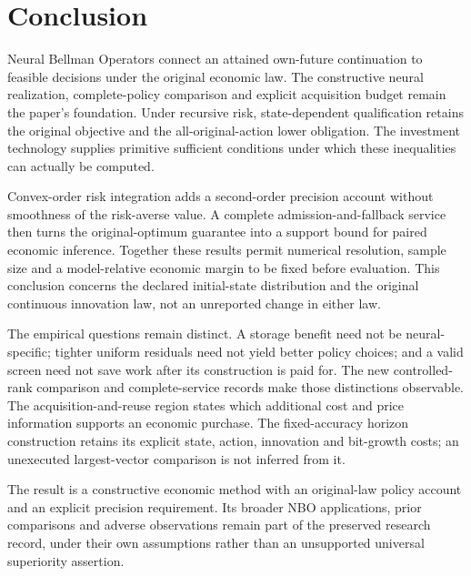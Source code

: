 \section{Conclusion}\label{sec:conclusion65}
Neural Bellman Operators connect an attained own-future continuation to feasible decisions under the original economic law. The constructive neural realization, complete-policy comparison and explicit acquisition budget remain the paper's foundation. Under recursive risk, state-dependent qualification retains the original objective and the all-original-action lower obligation. The investment technology supplies primitive sufficient conditions under which these inequalities can actually be computed.

Convex-order risk integration adds a second-order precision account without smoothness of the risk-averse value. A complete admission-and-fallback service then turns the original-optimum guarantee into a support bound for paired economic inference. Together these results permit numerical resolution, sample size and a model-relative economic margin to be fixed before evaluation. This conclusion concerns the declared initial-state distribution and the original continuous innovation law, not an unreported change in either law.

The empirical questions remain distinct. A storage benefit need not be neural-specific; tighter uniform residuals need not yield better policy choices; and a valid screen need not save work after its construction is paid for. The new controlled-rank comparison and complete-service records make those distinctions observable. The acquisition-and-reuse region states which additional cost and price information supports an economic purchase. The fixed-accuracy horizon construction retains its explicit state, action, innovation and bit-growth costs; an unexecuted largest-vector comparison is not inferred from it.

The result is a constructive economic method with an original-law policy account and an explicit precision requirement. Its broader NBO applications, prior comparisons and adverse observations remain part of the preserved research record, under their own assumptions rather than an unsupported universal superiority assertion.

